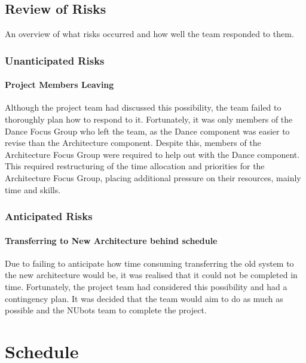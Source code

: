 \documentclass[english,12pt]{scrartcl}
\begin{document}
		\subsection{Review of Risks}
			An overview of what risks occurred and how well the team responded to them. 
			
			\subsubsection{Unanticipated Risks}
				\paragraph{Project Members Leaving}  
					Although the project team had discussed this possibility, the team failed to thoroughly plan how to respond to it.
					Fortunately, it was only members of the Dance Focus Group who left the team, as the Dance component was easier to revise than the Architecture component.
					Despite this, members of the Architecture Focus Group were required to help out with the Dance component.
					This required restructuring of the time allocation and priorities for the Architecture Focus Group, placing additional pressure on their resources, mainly time and skills. 
			
			\subsubsection{Anticipated Risks}
				\paragraph{Transferring to New Architecture behind schedule}  
					Due to failing to anticipate how time consuming transferring the old system to the new architecture would be, it was realised that it could not be completed in time.
					Fortunately, the project team had considered this possibility and had a contingency plan.
					It was decided that the team would aim to do as much as possible and the NUbots team to complete the project.

	\section{Schedule}
\end{document}
